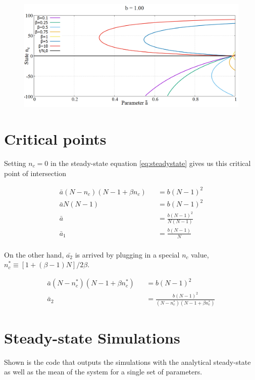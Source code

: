 \begin{figure}[h!]
 \centering
  \includegraphics[width=\linewidth]{images/appendix/phaseSpace/10.png}
\end{figure}

\newpage
\section{Critical points}
\label{apndx:crita1}
\hspace{\parindent} Setting $n_{c} = 0$ in the steady-state equation \eqref{eq:steadystate} gives us this critical point of intersection

\begin{eqnarray}
\bar{a}(N-n_{c})(N-1 + \beta n_{c}) &&= b(N-1)^{2} \\
\bar{a}N(N-1) &&= b(N-1)^{2} \\
\bar{a} &&= \frac{b(N-1)^{2}}{N(N-1)} \\
\bar{a}_{1} &&= \frac{b(N-1)}{N} \\
\end{eqnarray}

On the other hand, $\bar{a_{2}}$ is arrived by plugging in a special $n_{c}$ value, $n_{c}^{*} \equiv [1+(\beta-1)N]/2\beta$.

\begin{eqnarray}
\bar{a}(N-n_{c}^{*})(N-1 + \beta n_{c}^{*}) &&= b(N-1)^{2} \\
\bar{a}_{2} &&= \frac{b(N-1)^{2}}{(N-n_{c}^{*})(N-1 + \beta n_{c}^{*})}
\end{eqnarray}

\newpage
\section{Steady-state Simulations}
\label{apndx:steadstatesim}
Shown is the code that outputs the simulations with the analytical steady-state as well as the mean of the system for a single set of parameters.

